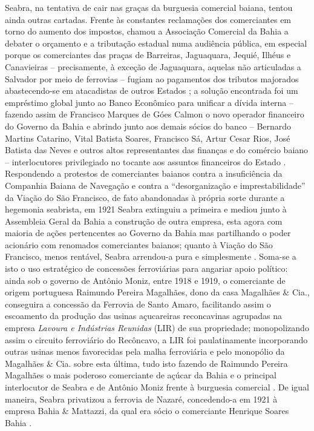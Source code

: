 Seabra, na tentativa de cair nas graças da burguesia comercial baiana, tentou ainda outras cartadas. Frente às constantes reclamações dos comerciantes em torno do aumento dos impostos, chamou a Associação Comercial da Bahia a debater o orçamento e a tributação estadual numa audiência pública, em especial porque os comerciantes das praças de Barreiras, Jaguaquara, Jequié, Ilhéus e Canavieiras -- precisamente, à exceção de Jaguaquara, aquelas não articuladas a Salvador por meio de ferrovias -- fugiam ao pagamentos dos tributos majorados abastecendo-se em atacadistas de outros Estados \cite[pp.~223-227]{CUNHA2011}; a solução encontrada foi um empréstimo global junto ao Banco Econômico para unificar a dívida interna -- fazendo assim de Francisco Marques de Góes Calmon o novo operador financeiro do Governo da Bahia e abrindo junto aos demais sócios do banco -- Bernardo Martins Catarino, Vital Batista Soares, Francisco Sá, Artur Cesar Rios, José Batista das Neves e outros altos representantes das finanças e do comércio baiano -- interlocutores privilegiado no tocante aos assuntos financeiros do Estado \cite[pp.~231-232]{CUNHA2011}. Respondendo a protestos de comerciantes baianos contra a insuficiência da Companhia Baiana de Navegação e contra a ``desorganização e imprestabilidade'' da Viação do São Francisco, de fato abandonadas à própria sorte durante a hegemonia seabrista, em 1921 Seabra extinguiu a primeira e mediou junto à Assembleia Geral da Bahia a construção de outra empresa, esta agora com maioria de ações pertencentes ao Governo da Bahia mas partilhando o poder acionário com renomados comerciantes baianos; quanto à Viação do São Francisco, menos rentável, Seabra arrendou-a pura e simplesmente \cite[pp.~222-223]{CUNHA2011}. Soma-se a isto o uso estratégico de concessões ferroviárias para angariar apoio político: ainda sob o governo de Antônio Moniz, entre 1918 e 1919, o comerciante de origem portuguesa Raimundo Pereira Magalhães, dono da casa Magalhães \& Cia., conseguira a concessão da Ferrovia de Santo Amaro, facilitando assim o escoamento da produção das usinas açucareiras reconcavinas agrupadas na empresa \textit{Lavoura e Indústrias Reunidas} (LIR) de sua propriedade; monopolizando assim o circuito ferroviário do Recôncavo, a LIR foi paulatinamente incorporando outras usinas menos favorecidas pela malha ferroviária e pelo monopólio da Magalhães \& Cia. sobre esta última, tudo isto fazendo de Raimundo Pereira Magalhães o mais poderoso comerciante de açúcar da Bahia e o principal interlocutor de Seabra e de Antônio Moniz frente à burguesia comercial \cite[pp.~227-228]{CUNHA2011}. De igual maneira, Seabra privatizou a ferrovia de Nazaré, concedendo-a em 1921 à empresa Bahia \& Mattazzi, da qual era sócio o comerciante Henrique Soares Bahia \cite[p.~228]{CUNHA2011}. 

